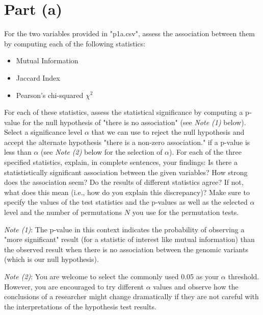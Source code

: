 \section{Part (a)}

For the two variables provided in "p1a.csv", assess the association between them by computing each of the following statistics:
\begin{itemize}
	\itemsep -0.3em 
	\item Mutual Information
	\item Jaccard Index
	\item Pearson's chi-squared $\chi^2$
\end{itemize}

\noindent
For each of these statistics, assess the statistical significance by computing a p-value for the null hypothesis of "there is no association" (see \textit{Note (1)} below). %
Select a significance level $\alpha$ that we can use to reject the null hypothesis and accept the alternate hypothesis "there is a non-zero association." if a p-value is less than $\alpha$ (see \textit{Note (2)} below for the selection of $\alpha$). For each of the three specified statistics, explain, in complete sentences, your findings: Is there a statististically significant association between the given variables? How strong does the association seem? Do the results of different statistics agree? If not, what does this mean (i.e., how do you explain this discrepancy)? Make sure to specify the values of the test statistics and the p-values as well as the selected $\alpha$ level and the number of permutations $N$ you use for the permutation tests.

\vspace{0.2cm}
\noindent
\textit{Note (1)}: The p-value in this context indicates the probability of observing a "more significant" result (for a statistic of interest like mutual information) than the observed result when there is no association between the genomic variants (which is our null hypothesis). 

\vspace{0.2cm}
\noindent
\textit{Note (2)}: You are welcome to select the commonly used 0.05 as your $\alpha$ threshold. However, you are encouraged to try different $\alpha$ values and observe how the conclusions of a researcher might change dramatically if they are not careful with the interpretations of the hypothesis test results.


